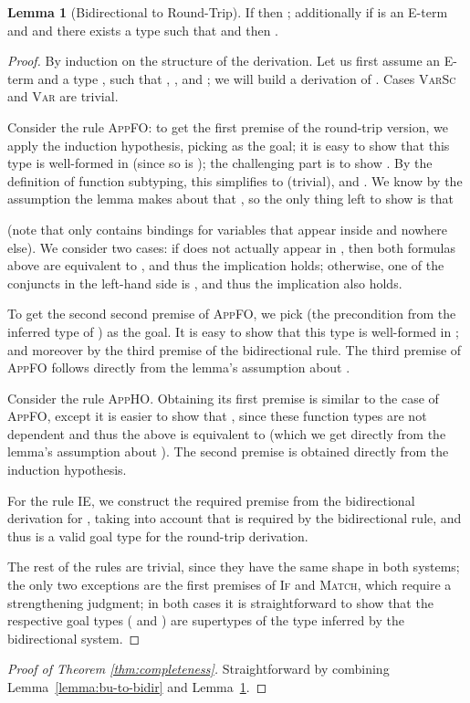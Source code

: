 \documentclass[10pt,preprint]{sigplanconf-pldi16}
\theoremstyle{definition}
\newtheorem{lemma}{Lemma}
\begin{document}
\begin{lemma}[Bidirectional to Round-Trip]\label{lemma:bidir-to-rt}
If  then ;
additionally if  is an E-term and  
and there exists a type  such that  and 
then .
\end{lemma}
\begin{proof}
By induction on the structure of the derivation.
Let us first assume an E-term  and a type , 
such that , , and ;
we will build a derivation of .
Cases \textsc{VarSc} and \textsc{Var} are trivial.

Consider the rule \textsc{AppFO}:
to get the first premise of the round-trip version, we apply the induction hypothesis,
picking  as the goal;
it is easy to show that this type is well-formed in  (since so is );
the challenging part is to show .
By the definition of function subtyping,
this simplifies to  (trivial),
and .
We know by the assumption the lemma makes about  that ,
so the only thing left to show is that 

(note that  only contains bindings for variables that appear inside  and nowhere else).
We consider two cases: if  does not actually appear in ,
then both formulas above are equivalent to , and thus the implication holds;
otherwise, one of the conjuncts in the left-hand side is , and thus the implication also holds.

To get the second second premise of \textsc{AppFO},
we pick  (the precondition from the inferred type of ) as the goal.
It is easy to show that this type is well-formed in ; 
and moreover  by the third premise of the bidirectional rule.
The third premise of \textsc{AppFO} follows directly from the lemma's assumption about .

Consider the rule \textsc{AppHO}.
Obtaining its first premise is similar to the case of \textsc{AppFO},
except it is easier to show that ,
since these function types are not dependent and thus the above is equivalent to 
(which we get directly from the lemma's assumption about ).
The second premise is obtained directly from the induction hypothesis.

For the rule \textsc{IE}, 
we construct the required premise 
from the bidirectional derivation for ,
taking into account that  is required by the bidirectional rule,
and thus  is a valid goal type for the round-trip derivation. 

The rest of the rules are trivial, since they have the same shape in both systems;
the only two exceptions are the first premises of \textsc{If} and \textsc{Match},
which require a strengthening judgment;
in both cases it is straightforward to show that the respective goal types ( and )
are supertypes of the type inferred by the bidirectional system.
\end{proof}

\begin{proof}[Proof of Theorem \ref{thm:completeness}]
Straightforward by combining Lemma~\ref{lemma:bu-to-bidir} and Lemma~\ref{lemma:bidir-to-rt}.
\end{proof}
\end{document}
